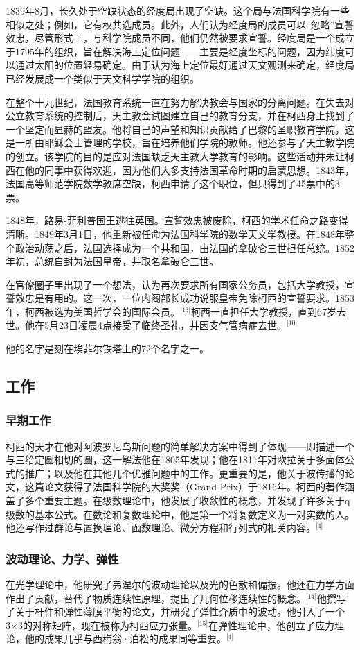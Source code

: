 1839年8月，长久处于空缺状态的经度局出现了空缺。这个局与法国科学院有一些相似之处；例如，它有权共选成员。此外，人们认为经度局的成员可以“忽略”宣誓效忠，尽管形式上，与科学院成员不同，他们仍然被要求宣誓。经度局是一个成立于1795年的组织，旨在解决海上定位问题——主要是经度坐标的问题，因为纬度可以通过太阳的位置轻易确定。由于认为海上定位最好通过天文观测来确定，经度局已经发展成一个类似于天文科学学院的组织。

在整个十九世纪，法国教育系统一直在努力解决教会与国家的分离问题。在失去对公立教育系统的控制后，天主教会试图建立自己的教育分支，并在柯西身上找到了一个坚定而显赫的盟友。他将自己的声望和知识贡献给了巴黎的圣职教育学院，这是一所由耶稣会士管理的学校，旨在培养他们学院的教师。他还参与了天主教学院的创立。该学院的目的是应对法国缺乏天主教大学教育的影响。这些活动并未让柯西在他的同事中获得欢迎，因为他们大多支持法国革命时期的启蒙思想。1843年，法国高等师范学院数学教席空缺，柯西申请了这个职位，但只得到了45票中的3票。

1848年，路易-菲利普国王逃往英国。宣誓效忠被废除，柯西的学术任命之路变得清晰。1849年3月1日，他重新被任命为法国科学院的数学天文学教授。在1848年整个政治动荡之后，法国选择成为一个共和国，由法国的拿破仑三世担任总统。1852年初，总统自封为法国皇帝，并取名拿破仑三世。

在官僚圈子里出现了一个想法，认为再次要求所有国家公务员，包括大学教授，宣誓效忠是有用的。这一次，一位内阁部长成功说服皇帝免除柯西的宣誓要求。1853年，柯西被选为美国哲学会的国际会员。\(^\text{[13]}\)柯西一直担任大学教授，直到67岁去世。他在5月23日凌晨4点接受了临终圣礼，并因支气管病症去世。\(^\text{[10]}\)

他的名字是刻在埃菲尔铁塔上的72个名字之一。
\subsection{工作}  
\subsubsection{早期工作}  
柯西的天才在他对阿波罗尼乌斯问题的简单解决方案中得到了体现——即描述一个与三给定圆相切的圆，这一解法他在1805年发现；他在1811年对欧拉关于多面体公式的推广；以及他在其他几个优雅问题中的工作。更重要的是，他关于波传播的论文，这篇论文获得了法国科学院的大奖奖（Grand Prix）于1816年。柯西的著作涵盖了多个重要主题。在级数理论中，他发展了收敛性的概念，并发现了许多关于q级数的基本公式。在数论和复数理论中，他是第一个将复数定义为一对实数的人。他还写作过群论与置换理论、函数理论、微分方程和行列式的相关内容。\(^\text{[4]}\)
\subsubsection{波动理论、力学、弹性}  
在光学理论中，他研究了弗涅尔的波动理论以及光的色散和偏振。他还在力学方面作出了贡献，替代了物质连续性原理，提出了几何位移连续性的概念。\(^\text{[14]}\)他撰写了关于杆件和弹性薄膜平衡的论文，并研究了弹性介质中的波动。他引入了一个3×3的对称矩阵，现在被称为柯西应力张量。\(^\text{[15]}\)在弹性理论中，他创立了应力理论，他的成果几乎与西梅翁·泊松的成果同等重要。\(^\text{[4]}\)
